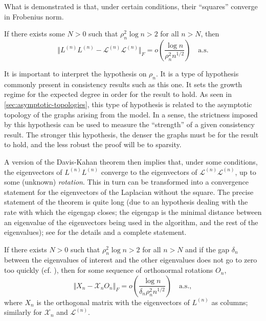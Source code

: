 \documentclass[../../main.tex]{subfiles} %
\begin{document}
	What is demonstrated is that, under certain conditions, their ``squares'' converge 
	in Frobenius norm.
	\begin{proposition}
		If there exists some \(N > 0\) such that \(\rho_n^2 \log n > 2\) for all \(n 
		> 
		N\), then
		\begin{equation}
			\Vert L^{(n)} L^{(n)} - \mathscr L^{(n)} \mathscr L^{(n)} \Vert_F = 
			o \left( \frac{\log n}{\rho_n^2 n^{1/2}}\right) \quad \text{a.s.}
		\end{equation}
	\end{proposition}

	It is important to interpret the hypothesis on \(\rho_n\). It is a type of 
	hypothesis 
	commonly present in consistency results such as this one. It sets the growth 
	regime for the expected degree in order for the result to hold. As seen in 
	\ref{sec:asymptotic-topologies}, this type of hypothesis is related to the 
	asymptotic topology of the graphs arising from the model. In a sense, the 
	strictness imposed by this hypothesis can be used to measure the ``strength'' of 
	a given consistency result. The stronger this hypothesis, the denser the graphs 
	must be for the result to hold, and the less robust the proof will be to sparsity.
	
	A version of the Davis-Kahan theorem then implies that, under some conditions, 
	the eigenvectors of \(L^{(n)} L^{(n)}\) converge to the eigenvectors of \(\mathscr 
	L^{(n)} \mathscr L^{(n)}\), up to some (unknown) \textit{rotation}. This in turn can 
	be transformed into a convergence statement for the eigenvectors of the 
	Laplacian without the square. The precise statement of the theorem is quite long 
	(due to an hypothesis dealing with the rate with which the eigengap closes; 
	the eigengap is the minimal distance between an eigenvalue of the 
	eigenvectors being used in the algorithm, and the rest of the eigenvalues);  
	see \cite{rohe_spectral_2011} for the details and a complete statement.
	\begin{proposition}
		If there exists \(N > 0\) such that \(\rho_n^2 \log n > 2\) for all \(n > N\) 
		and 
		if the gap \(\delta_n\) between the eigenvalues of interest and the other 
		eigenvalues does not go to zero too quickly (cf. \cite{rohe_spectral_2011}), 
		then for some sequence of orthonormal rotations \(O_n\),
		\begin{equation}
			\Vert X_n - \mathscr X_n O_n \Vert_F = 
			o \left( \frac{\log n}{\delta_n \rho_n^2 n^{1/2}}\right) \quad \text{a.s.},
		\end{equation}
		where \(X_n\) is the orthogonal matrix with the eigenvectors of \(L^{(n)}\) as 
		columns; similarly for \(\mathscr X_n\) and \(\mathscr L ^{(n)}\).
		\label{prop:convergence-eigenvectors}
	\end{proposition}
\end{document}

